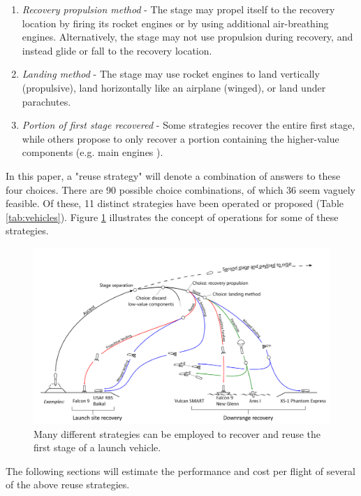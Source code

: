 \documentclass{iaf-iac}
\begin{document}
\begin{multicols}{2}
\begin{enumerate}
    \item \textit{Recovery propulsion method} - The stage may propel itself to the recovery location by firing its rocket engines or by using additional air-breathing engines. Alternatively, the stage may not use propulsion during recovery, and instead glide or fall to the recovery location.

    \item \textit{Landing method} - The stage may use rocket engines to land vertically (propulsive), land horizontally like an airplane (winged), or land under parachutes.

    \item \textit{Portion of first stage recovered} - Some strategies recover the entire first stage, while others propose to only recover a portion containing the higher-value components (e.g. main engines \cite{Ragab2015}).
\end{enumerate}

In this paper, a "reuse strategy" will denote a combination of answers to these four choices. There are 90 possible choice combinations, of which 36 seem vaguely feasible. Of these, 11 distinct strategies have been operated or proposed (Table \ref{tab:vehicles}). Figure \ref{fig:recov_strat_diagram} illustrates the concept of operations for some of these strategies.

\begin{figure}
    \centering
    \includegraphics[width=1\textwidth]{figures/recovery_options_annotated}
    \caption{\label{fig:recov_strat_diagram} Many different strategies can be employed to recover and reuse the first stage of a launch vehicle.}
\end{figure}

The following sections will estimate the performance and cost per flight of several of the above reuse strategies.


\end{multicols}
\end{document}
